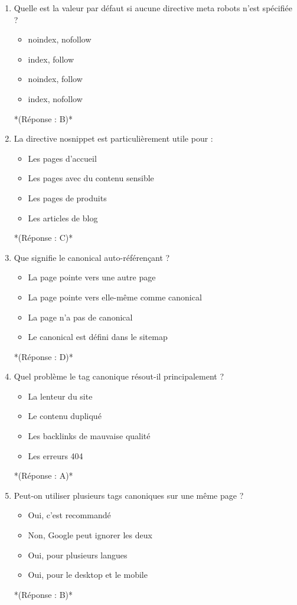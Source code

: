 \documentclass[12pt,a4paper,twoside]{report}
\begin{document}
\begin{enumerate}
\item Quelle est la valeur par défaut si aucune directive meta robots n'est spécifiée ?
\begin{itemize}
\item[A)] noindex, nofollow
\item[B)] index, follow
\item[C)] noindex, follow
\item[D)] index, nofollow
\end{itemize}
*(Réponse : B)*

\item La directive nosnippet est particulièrement utile pour :
\begin{itemize}
\item[A)] Les pages d'accueil
\item[B)] Les pages avec du contenu sensible
\item[C)] Les pages de produits
\item[D)] Les articles de blog
\end{itemize}
*(Réponse : C)*

\item Que signifie le canonical auto-référençant ?
\begin{itemize}
\item[A)] La page pointe vers une autre page
\item[B)] La page pointe vers elle-même comme canonical
\item[C)] La page n'a pas de canonical
\item[D)] Le canonical est défini dans le sitemap
\end{itemize}
*(Réponse : D)*

\item Quel problème le tag canonique résout-il principalement ?
\begin{itemize}
\item[A)] La lenteur du site
\item[B)] Le contenu dupliqué
\item[C)] Les backlinks de mauvaise qualité
\item[D)] Les erreurs 404
\end{itemize}
*(Réponse : A)*

\item Peut-on utiliser plusieurs tags canoniques sur une même page ?
\begin{itemize}
\item[A)] Oui, c'est recommandé
\item[B)] Non, Google peut ignorer les deux
\item[C)] Oui, pour plusieurs langues
\item[D)] Oui, pour le desktop et le mobile
\end{itemize}
*(Réponse : B)*


\end{enumerate}
\end{document}
